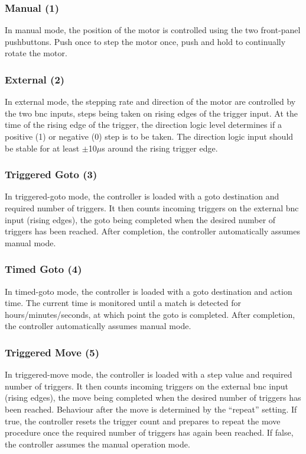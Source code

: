 \documentclass[10pt]{article}
\begin{document}
\subsubsection{Manual (1)}
In manual mode, the position of the motor is controlled using the two front-panel pushbuttons.  Push once to step the motor once, push and hold to continually rotate the motor.  

\subsubsection{External (2)}
In external mode, the stepping rate and direction of the motor are controlled by the two bnc inputs,  steps being taken on rising edges of the trigger input.  At the time of the rising edge of the trigger, the direction logic level determines if a positive (1) or negative (0) step is to be taken.  The direction logic input should be stable for at least $\pm$10$\mu$s around the rising trigger edge.  

\subsubsection{Triggered Goto (3)}
In triggered-goto mode, the controller is loaded with a goto destination and required number of triggers.  It then counts incoming triggers on the external bnc input (rising edges), the goto being completed when the desired number of triggers has been reached.  After completion, the controller automatically assumes manual mode.      

\subsubsection{Timed Goto (4)}
In timed-goto mode, the controller is loaded with a goto destination and action time.  The current time is monitored until a match is detected for hours/minutes/seconds, at which point the goto is completed.  After completion, the controller automatically assumes manual mode.  

\subsubsection{Triggered Move (5)}
In triggered-move mode, the controller is loaded with a step value and required number of triggers.  It then counts incoming triggers on the external bnc input (rising edges), the move being completed when the desired number of triggers has been reached.  Behaviour after the move is determined by the ``repeat'' setting.  If true, the controller resets the trigger count and prepares to repeat the move procedure once the required number of triggers has again been reached.  If false, the controller assumes the manual operation mode.  
\end{document}
